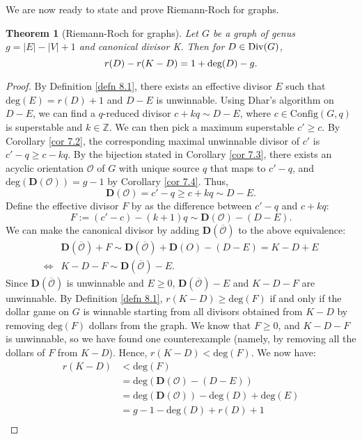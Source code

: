\documentclass[openany, amssymb, psamsfonts]{amsart}
\newtheorem{thm}{Theorem}[section]
\theoremstyle{definition}
\numberwithin{equation}{section}
\begin{document}
We are now ready to state and prove Riemann-Roch for graphs.

\begin{thm}[Riemann-Roch for graphs]
\label{thm 8.1}
Let $G$ be a graph of genus $g=|E|-|V|+1$ and canonical divisor K. Then for $D\in \textup{Div}(G)$,
\[r(D)-r(K-D)=1+\textup{deg}(D)-g.\]
\end{thm}
\begin{proof}
By Definition \ref{defn 8.1}, there exists an effective divisor $E$ such that $\text{deg}(E)=r(D)+1$ and $D-E$ is unwinnable. Using Dhar's algorithm on $D-E$, we can find a $q$-reduced divisor $c+kq\sim D-E$, where $c\in \text{Config}(G,q)$ is superstable and $k\in \mathbb{Z}$. We can then pick a maximum superstable $c'\geq c$. By Corollary \ref{cor 7.2}, the corresponding maximal unwinnable divisor of $c'$ is $c'-q\geq c-kq$. By the bijection stated in Corollary \ref{cor 7.3}, there exists an acyclic orientation $\mathcal{O}$ of $G$ with unique source $q$ that maps to $c'-q$, and $\text{deg}(\mathbf{D}(\mathcal{O}))=g-1$ by Corollary \ref{cor 7.4}. Thus,
\[\textbf{D}(\mathcal{O})=c'-q\geq c+kq\sim D-E.\]
Define the effective divisor $F$ by as the difference between $c'-q$ and $c+kq$:
\[F:=(c'-c)-(k+1)q\sim \textbf{D}(\mathcal{O})-(D-E).\]
We can make the canonical divisor by adding $\textbf{D}(\overline{\mathcal{O}})$ to the above equivalence:
\begin{align*}
    &\textbf{D}(\overline{\mathcal{O}})+F\sim \textbf{D}(\overline{\mathcal{O}})+\textbf{D}(O)-(D-E)=K-D+E\\
    \iff &K-D-F\sim \textbf{D}(\overline{\mathcal{O}})-E.
\end{align*}
Since $\textbf{D}(\overline{\mathcal{O}})$ is unwinnable and $E\geq 0$, $\textbf{D}(\overline{\mathcal{O}})-E$ and $K-D-F$ are unwinnable. By Definition \ref{defn 8.1}, $r(K-D)\geq \text{deg}(F)$ if and only if the dollar game on $G$ is winnable starting from all divisors obtained from $K-D$ by removing $\text{deg}(F)$ dollars from the graph. We know that $F\geq 0$, and $K-D-F$ is unwinnable, so we have found one counterexample (namely, by removing all the dollars of $F$ from $K-D$). Hence, $r(K-D)< \text{deg}(F)$. We now have:
\begin{align*}
    r(K-D)&<\text{deg}(F)\\
    &=\text{deg}(\mathbf{D}(\mathcal{O})-(D-E))\\
    &=\text{deg}(\mathbf{D}(\mathcal{O}))-\text{deg}(D)+\text{deg}(E)\\
    &=g-1-\text{deg}(D)+r(D)+1\\

\end{align*}
\end{proof}
\end{document}
